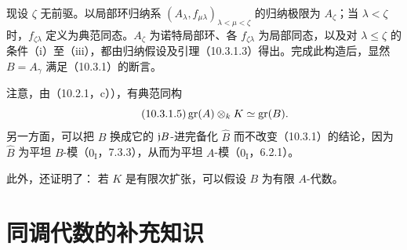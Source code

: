 现设 $\zeta$ 无前驱。以局部环归纳系 $(A_\lambda,f_{\mu\lambda})_{\lambda<\mu<\zeta}$ 的归纳极限为 $A_\zeta$；当 $\lambda<\zeta$ 时，$f_{\zeta\lambda}$ 定义为典范同态。$A_\zeta$ 为诺特局部环、各 $f_{\zeta\lambda}$ 为局部同态，以及对 $\lambda\leq\zeta$ 的条件（i）至（iii），都由归纳假设及引理（10.3.1.3）得出。完成此构造后，显然 $B=A_\gamma$ 满足（10.3.1）的断言。

注意，由（10.2.1，c）），有典范同构
\begin{equation}\tag{10.3.1.5}
\operatorname{gr}(A)\otimes_kK\simeq\operatorname{gr}(B).
\end{equation}
另一方面，可以把 $B$ 换成它的 $\mathfrak j B$-进完备化 $\widehat B$ 而不改变（10.3.1）的结论，因为 $\widehat B$ 为平坦 $B$-模（$0_{\mathrm I}$，7.3.3），从而为平坦 $A$-模（$0_{\mathrm I}$，6.2.1）。

此外，还证明了：
若 $K$ 是有限次扩张，可以假设 $B$ 为有限 $A$-代数。\par

\section{同调代数的补充知识}
